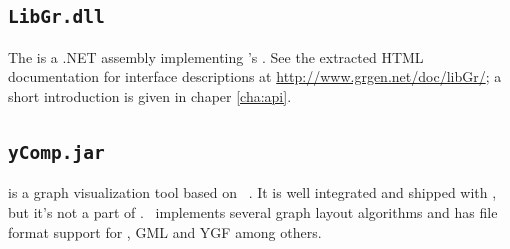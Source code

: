 \subsection{\texttt{LibGr.dll}}
\label{sct:API}
The \LibGr{} is a .NET assembly implementing \GrG's .
See the extracted HTML documentation for interface descriptions at \url{http://www.grgen.net/doc/libGr/};
a short introduction is given in chaper \ref{cha:api}. 

\subsection{\texttt{yComp.jar}}
\label{tools:ycomp}
\yComp{} \cite{ycomp} is a graph visualization tool based on \yFiles\ \cite{yfiles}. 
It is well integrated and shipped with \GrG, but it's not a part of \GrG.
\yComp\ implements several graph layout algorithms and has file format support for , GML and YGF among others. 

